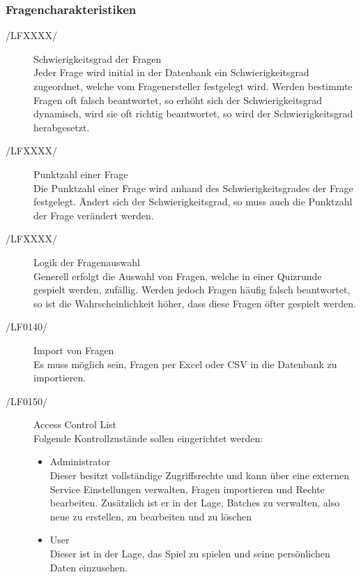 \documentclass[11pt,a4paper]{scrreprt}
\begin{document}
\subsubsection{Fragencharakteristiken}
\begin{description}
\item[/LFXXXX/] Schwierigkeitsgrad der Fragen \\
Jeder Frage wird initial in der Datenbank ein Schwierigkeitsgrad zugeordnet, welche vom Fragenersteller festgelegt wird. Werden bestimmte Fragen oft falsch beantwortet, so erhöht sich der Schwierigkeitsgrad dynamisch, wird sie oft richtig beantwortet, so wird der Schwierigkeitsgrad herabgesetzt.
\item[/LFXXXX/] Punktzahl einer Frage \\
Die Punktzahl einer Frage wird anhand des Schwierigkeitsgrades der Frage festgelegt. Ändert sich der Schwierigkeitsgrad, so muss auch die Punktzahl der Frage verändert werden.
\item[/LFXXXX/] Logik der Fragenauswahl \\
Generell erfolgt die Auswahl von Fragen, welche in einer Quizrunde gespielt werden, zufällig. Werden jedoch Fragen häufig falsch beantwortet, so ist die Wahrscheinlichkeit höher, dass diese Fragen öfter gespielt werden.
\item[/LF0140/] Import von Fragen \\
Es muss möglich sein, Fragen per Excel oder CSV in die Datenbank zu importieren.
\end{description}
\begin{description}
\item[/LF0150/] Access Control List \\
Folgende Kontrollzustände sollen eingerichtet werden:
	\begin{itemize}
	\item Administrator \\
	Dieser besitzt vollständige Zugriffsrechte und kann über eine externen Service Einstellungen verwalten, Fragen 				importieren und Rechte bearbeiten. Zusätzlich ist er in der Lage, Batches zu verwalten, also neue zu erstellen, zu 			bearbeiten und zu löschen
	\item User \\
	Dieser ist in der Lage, das Spiel zu spielen und seine persönlichen Daten einzusehen.
	\end{itemize}

\end{description}
\end{document}
